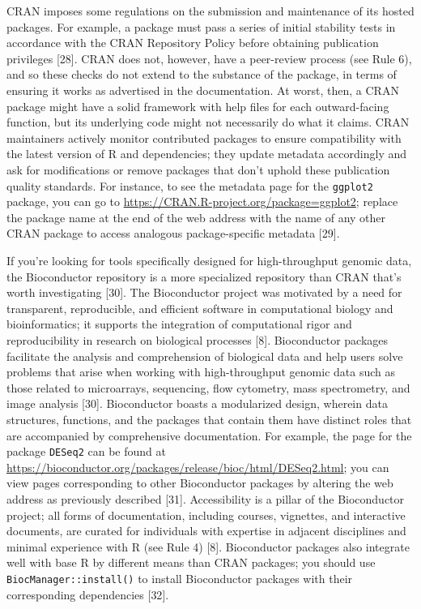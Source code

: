 \documentclass[10pt,letterpaper]{article}
\begin{document}
CRAN imposes some regulations on the submission and maintenance of its
hosted packages. For example, a package must pass a series of initial
stability tests in accordance with the CRAN Repository Policy before
obtaining publication privileges {[}28{]}. CRAN does not, however, have
a peer-review process (see Rule 6), and so these checks do not extend to
the substance of the package, in terms of ensuring it works as
advertised in the documentation. At worst, then, a CRAN package might
have a solid framework with help files for each outward-facing function,
but its underlying code might not necessarily do what it claims. CRAN
maintainers actively monitor contributed packages to ensure
compatibility with the latest version of R and dependencies; they update
metadata accordingly and ask for modifications or remove packages that
don't uphold these publication quality standards. For instance, to see
the metadata page for the \texttt{ggplot2} package, you can go to
\url{https://CRAN.R-project.org/package=ggplot2}; replace the package
name at the end of the web address with the name of any other CRAN
package to access analogous package-specific metadata {[}29{]}.

If you're looking for tools specifically designed for high-throughput
genomic data, the Bioconductor repository is a more specialized
repository than CRAN that's worth investigating {[}30{]}. The
Bioconductor project was motivated by a need for transparent,
reproducible, and efficient software in computational biology and
bioinformatics; it supports the integration of computational rigor and
reproducibility in research on biological processes {[}8{]}.
Bioconductor packages facilitate the analysis and comprehension of
biological data and help users solve problems that arise when working
with high-throughput genomic data such as those related to microarrays,
sequencing, flow cytometry, mass spectrometry, and image analysis
{[}30{]}. Bioconductor boasts a modularized design, wherein data
structures, functions, and the packages that contain them have distinct
roles that are accompanied by comprehensive documentation. For example,
the page for the package \texttt{DESeq2} can be found at
\url{https://bioconductor.org/packages/release/bioc/html/DESeq2.html};
you can view pages corresponding to other Bioconductor packages by
altering the web address as previously described {[}31{]}. Accessibility
is a pillar of the Bioconductor project; all forms of documentation,
including courses, vignettes, and interactive documents, are curated for
individuals with expertise in adjacent disciplines and minimal
experience with R (see Rule 4) {[}8{]}. Bioconductor packages also
integrate well with base R by different means than CRAN packages; you
should use \texttt{BiocManager::install()} to install Bioconductor
packages with their corresponding dependencies {[}32{]}.
\end{document}
